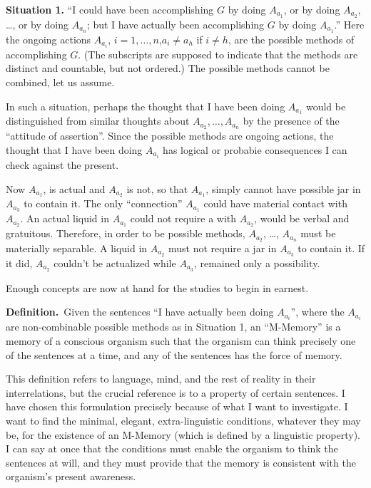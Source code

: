 \begin{hangers}
\textbf{Situation 1.} \enquote{I could have been accomplishing $G$ by doing $A_{a_1}$, or by 
doing $A_{a_2}$, \ldots, or by doing $A_{a_n}$; but I have actually been accomplishing $G$ by 
doing $A_{a_1}$.} Here the ongoing actions $A_{a_i}$, $i=1,\ldots,n$,$a_i\neq a_h$ if $i\neq h$, are 
the possible methods of accomplishing $G$. (The subscripts are supposed to 
indicate that the methods are distinct and countable, but not ordered.) The 
possible methods cannot be combined, let us assume. 
\end{hangers}

In such a situation, perhaps the thought that I have been doing $A_{a_1}$
would be distinguished from similar thoughts about $A_{a_2}, \ldots, A_{a_n}$ by the
presence of the \enquote{attitude of assertion}. Since the possible methods are 
ongoing actions, the thought that I have been doing $A_{a_i}$ has logical or 
probabie consequences I can check against the present. 

Now $A_{a_1}$, is actual and $A_{a_2}$ is not, so that $A_{a_1}$, simply cannot have 
possible jar in $A_{a_3}$ to contain it. The only \enquote{connection} $A_{a_1}$ could have
material contact with $A_{a_2}$. An actual liquid in $A_{a_1}$ could not require a 
with $A_{a_2}$, would be verbal and gratuitous. Therefore, in order to be possible 
methods, $A_{a_2}$, \ldots, $A_{a_n}$ must be materially separable. A liquid in $A_{a_2}$ must
not require a jar in $A_{a_3}$ to contain it. If it did, $A_{a_2}$ couldn't be actualized 
while $A_{a_3}$, remained only a possibility. 

Enough concepts are now at hand for the studies to begin in earnest. 


\newcommand{\definition}{\textbf{Definition.}}
\newcommand{\assumption}[1]{\textit{Assumption #1.}}
\newcommand{\conclusion}[1]{\textbf{Conclusion #1.}}

\begin{hangers}
\definition\ Given the sentences \enquote{I have actually been doing $A_{a_i}$}, where 
the $A_{a_i}$ are non-combinable possible methods as in Situation 1, an 
\enquote{M-Memory} is a memory of a conscious organism such that the organism 
can think precisely one of the sentences at a time, and any of the sentences 
has the force of memory. 
\end{hangers}

This definition refers to language, mind, and the rest of reality in their 
interrelations, but the crucial reference is to a property of certain sentences. 
I have chosen this formulation precisely because of what I want to 
investigate. I want to find the minimal, elegant, extra-linguistic conditions, 
whatever they may be, for the existence of an M-Memory (which is defined 
by a linguistic property). I can say at once that the conditions must enable 
the organism to think the sentences at will, and they must provide that the 
memory is consistent with the organism's present awareness. 

